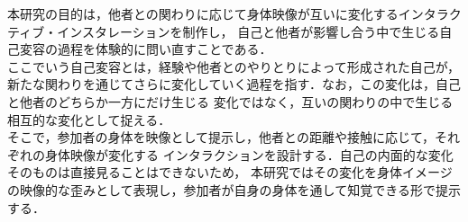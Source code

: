 本研究の目的は，他者との関わりに応じて身体映像が互いに変化するインタラクティブ・インスタレーションを制作し，
自己と他者が影響し合う中で生じる自己変容の過程を体験的に問い直すことである．\\
ここでいう自己変容とは，経験や他者とのやりとりによって形成された自己が，
新たな関わりを通じてさらに変化していく過程を指す．なお，この変化は，自己と他者のどちらか一方にだけ生じる
変化ではなく，互いの関わりの中で生じる相互的な変化として捉える．\\
そこで，参加者の身体を映像として提示し，他者との距離や接触に応じて，それぞれの身体映像が変化する
インタラクションを設計する．自己の内面的な変化そのものは直接見ることはできないため，
本研究ではその変化を身体イメージの映像的な歪みとして表現し，参加者が自身の身体を通して知覚できる形で提示する．
